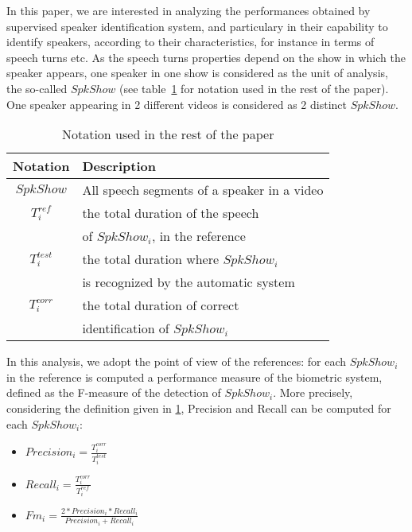 



In this paper, we are interested in analyzing the performances obtained by supervised speaker identification system, and particulary in their capability to identify speakers, according to their characteristics, for instance in terms of speech turns etc. As the speech turns properties depend on the show in which the speaker appears, one speaker in one show is considered as the unit of analysis, the so-called $SpkShow$ (see table~\ref{notation} for notation used in the rest of the paper). One speaker appearing in 2 different videos is considered as 2 distinct $SpkShow$.

\begin{table}[ht]
  \centering
    \begin{tabular}{|c|l|}
        \hline 
        Notation & Description \\ 
        \hline 
        \hline
        $SpkShow$ & All speech segments of a speaker in a video \\ 
        $T^{ref}_i$ & the total duration of the speech\\
        & of  $SpkShow_i$, in the reference \\
        $T^{test}_i$ & the total duration where $SpkShow_i$\\
        & is recognized by the automatic system\\
        $T^{corr}_i$ & the total duration of correct\\
        & identification of $SpkShow_i$\\
        \hline 
    \end{tabular} 
    \caption{Notation used in the rest of the paper}
    \label{notation}
\end{table}

In this analysis, we adopt the point of view of the references: for each $SpkShow_i$ in the reference is computed a performance measure of the biometric system, defined as the F-measure of the detection of $SpkShow_i$. More precisely, considering the definition given in \ref{notation}, Precision and Recall can be computed for each $SpkShow_i$:
\begin{itemize}
\item $Precision_i=\frac{T^{corr}_i}{T^{test}_i}$
\item $Recall_i=\frac{T^{corr}_i}{T^{ref}_i}$
\item $Fm_i=\frac{2*Precision_i*Recall_i}{Precision_i+Recall_i}$
\end{itemize} 

